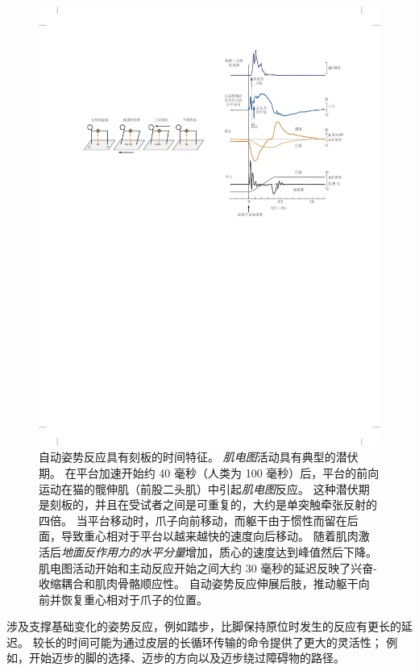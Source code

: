 \begin{figure}[htbp]
	\centering
	\includegraphics[width=1.0\linewidth]{chap36/fig_36_3}
	\caption{自动姿势反应具有刻板的时间特征。
		\textit{肌电图}活动具有典型的潜伏期。
		在平台加速开始约 40 毫秒（人类为 100 毫秒）后，平台的前向运动在猫的髋伸肌（前股二头肌）中引起\textit{肌电图}反应。
		这种潜伏期是刻板的，并且在受试者之间是可重复的，大约是单突触牵张反射的四倍。
		当平台移动时，爪子向前移动，而躯干由于惯性而留在后面，导致重心相对于平台以越来越快的速度向后移动。
		随着肌肉激活后\textit{地面反作用力的水平分量}增加，质心的速度达到峰值然后下降。
		肌电图活动开始和主动反应开始之间大约 30 毫秒的延迟反映了兴奋-收缩耦合和肌肉骨骼顺应性。
		自动姿势反应伸展后肢，推动躯干向前并恢复重心相对于爪子的位置。}
	\label{fig:36_3}
\end{figure}


涉及支撑基础变化的姿势反应，例如踏步，比脚保持原位时发生的反应有更长的延迟。
较长的时间可能为通过皮层的长循环传输的命令提供了更大的灵活性；
例如，开始迈步的脚的选择、迈步的方向以及迈步绕过障碍物的路径。


